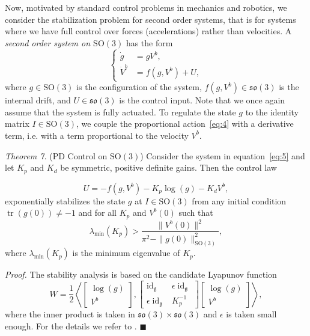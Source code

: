 \documentclass[10pt,twocolumn]{article}
\newcommand{\SO}{\mathrm{SO}}
\newcommand{\so}{\mathfrak{so}}
\newcommand{\gfrak}{\mathfrak g}
\newcommand{\tr}{\operatorname{tr}}
\newcommand{\idg}{\operatorname{id}_{\gfrak}}
\newcounter{paperitem}
\newcommand{\paperhead}[3]{\refstepcounter{paperitem}\par\medskip\noindent\textit{#1}\label{#3} #2\par}
\newcommand{\proofbox}{\hfill$\blacksquare$}
\begin{document}
Now, motivated by standard control problems in mechanics and robotics, we consider the stabilization problem for second order systems, that is for systems where we have full control over forces (accelerations) rather than velocities. A \emph{second order system on $\SO(3)$} has the form
\begin{equation*}
\left\{\begin{aligned}
\dot g&=gV^b,\\
\dot V^b&=f(g,V^b)+U,
\end{aligned}\right.\tag{5}\label{eq:5}
\end{equation*}
where $g\in\SO(3)$ is the configuration of the system, $f(g,V^b)\in\so(3)$ is the internal drift, and $U\in\so(3)$ is the control input. Note that we once again assume that the system is fully actuated. To regulate the state $g$ to the identity matrix $I\in\SO(3)$, we couple the proportional action~\eqref{eq:4} with a derivative term, i.e. with a term proportional to the velocity $V^b$.

\paperhead{Theorem 7.}{(PD Control on $\SO(3)$) Consider the system in equation~\eqref{eq:5} and let $K_p$ and $K_d$ be symmetric, positive definite gains. Then the control law}{thm:pd-so3}
\begin{equation*}
U=-f(g,V^b)-K_p\log(g)-K_dV^b,\tag{6}\label{eq:6}
\end{equation*}
exponentially stabilizes the state $g$ at $I\in\SO(3)$ from any initial condition $\tr(g(0))\neq-1$ and for all $K_p$ and $V^b(0)$ such that
\begin{equation*}
\lambda_{\min}(K_p)>\frac{\|V^b(0)\|^2}{\pi^2-\|g(0)\|_{\SO(3)}^2},
\end{equation*}
where $\lambda_{\min}(K_p)$ is the minimum eigenvalue of $K_p$.

\noindent\textit{Proof.} The stability analysis is based on the candidate Lyapunov function
\begin{equation*}
W=\frac12\left\langle
\begin{bmatrix}\log(g)\\V^b\end{bmatrix},
\begin{bmatrix}
\idg&\epsilon\idg\\
\epsilon\idg&K_p^{-1}
\end{bmatrix}
\begin{bmatrix}\log(g)\\V^b\end{bmatrix}
\right\rangle,
\end{equation*}
where the inner product is taken in $\so(3)\times\so(3)$ and $\epsilon$ is taken small enough. For the details we refer to \cite{8}. \proofbox
\end{document}
